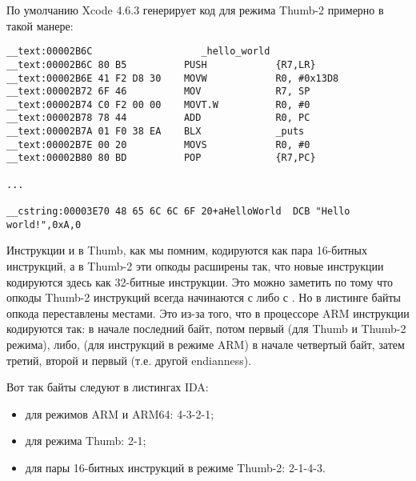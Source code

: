 \subsectionold{\OptimizingXcodeIV (\ThumbTwoMode)}

По умолчанию Xcode 4.6.3 генерирует код для режима Thumb-2 примерно в такой манере:

\begin{lstlisting}[caption=\OptimizingXcodeIV (\ThumbTwoMode)]
__text:00002B6C                   _hello_world
__text:00002B6C 80 B5          PUSH            {R7,LR}
__text:00002B6E 41 F2 D8 30    MOVW            R0, #0x13D8
__text:00002B72 6F 46          MOV             R7, SP
__text:00002B74 C0 F2 00 00    MOVT.W          R0, #0
__text:00002B78 78 44          ADD             R0, PC
__text:00002B7A 01 F0 38 EA    BLX             _puts
__text:00002B7E 00 20          MOVS            R0, #0
__text:00002B80 80 BD          POP             {R7,PC}

...

__cstring:00003E70 48 65 6C 6C 6F 20+aHelloWorld  DCB "Hello world!",0xA,0
\end{lstlisting}


\myindex{\ThumbTwoMode}
Инструкции  и  в Thumb, как мы помним, кодируются как пара 16-битных инструкций, 
а в Thumb-2 эти  опкоды расширены так, что новые инструкции кодируются здесь как 
32-битные инструкции.
Это можно заметить по тому что опкоды Thumb-2 инструкций всегда начинаются с  либо с .
Но в листинге \IDA байты опкода переставлены местами.
Это из-за того, что в процессоре ARM инструкции кодируются так:
в начале последний байт, потом первый (для Thumb и Thumb-2 режима), либо, 
(для инструкций в режиме ARM) в начале четвертый байт, затем третий, второй и первый 
(т.е. другой \gls{endianness}).

Вот так байты следуют в листингах IDA:

\begin{itemize}
\item для режимов ARM и ARM64: 4-3-2-1;
\item для режима Thumb: 2-1;
\item для пары 16-битных инструкций в режиме Thumb-2: 2-1-4-3.
\end{itemize}

